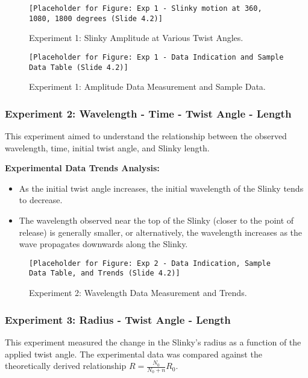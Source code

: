 \documentclass{mcmthesis}  %
\begin{document}
\begin{figure}[h!]
    \centering
    \texttt{[Placeholder for Figure: Exp 1 - Slinky motion at 360, 1080, 1800 degrees (Slide 4.2)]}
    \caption{Experiment 1: Slinky Amplitude at Various Twist Angles.}
    \label{fig:exp1_amplitude_twists}
\end{figure}

\begin{figure}[h!]
    \centering
    \texttt{[Placeholder for Figure: Exp 1 - Data Indication and Sample Data Table (Slide 4.2)]}
    \caption{Experiment 1: Amplitude Data Measurement and Sample Data.}
    \label{fig:exp1_amplitude_data}
\end{figure}

\subsubsection{Experiment 2: Wavelength - Time - Twist Angle - Length}
This experiment aimed to understand the relationship between the observed wavelength, time, initial twist angle, and Slinky length.

\textbf{Experimental Data Trends Analysis:}
\begin{itemize}
    \item As the initial twist angle increases, the initial wavelength of the Slinky tends to decrease.
    \item The wavelength observed near the top of the Slinky (closer to the point of release) is generally smaller, or alternatively, the wavelength increases as the wave propagates downwards along the Slinky.
\end{itemize}

\begin{figure}[h!]
    \centering
    \texttt{[Placeholder for Figure: Exp 2 - Data Indication, Sample Data Table, and Trends (Slide 4.2)]}
    \caption{Experiment 2: Wavelength Data Measurement and Trends.}
    \label{fig:exp2_wavelength_data}
\end{figure}

\subsubsection{Experiment 3: Radius - Twist Angle - Length}
This experiment measured the change in the Slinky's radius as a function of the applied twist angle. The experimental data was compared against the theoretically derived relationship \(R = \frac{N_0}{N_0+n}R_0\).
\end{document}

